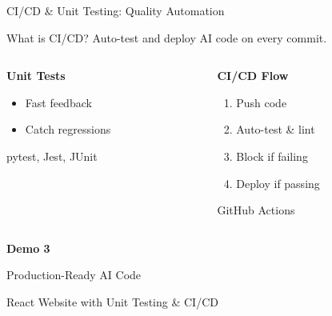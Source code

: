 \documentclass[aspectratio=169]{beamer}
\begin{document}
\begin{frame}{CI/CD \& Unit Testing: Quality Automation}
  \begin{block}{What is CI/CD?}
    Auto-test and deploy AI code on every commit.
  \end{block}

  \vspace{0.5cm}

  \begin{columns}[T]
    \begin{column}{0.48\textwidth}
      \centering
      \large\bfseries
      \textcolor{conesaTeal}{Unit Tests}

      \vspace{0.3cm}
      \normalsize

      \begin{itemize}
        \item Fast feedback
        \item Catch regressions
      \end{itemize}

      \vspace{0.2cm}
      \small
      pytest, Jest, JUnit
    \end{column}
    \begin{column}{0.48\textwidth}
      \centering
      \large\bfseries
      \textcolor{conesaOrange}{CI/CD Flow}

      \vspace{0.3cm}
      \normalsize

      \begin{enumerate}
        \item Push code
        \item Auto-test \& lint
        \item Block if failing
        \item Deploy if passing
      \end{enumerate}

      \vspace{0.2cm}
      \small
      GitHub Actions
    \end{column}
  \end{columns}
\end{frame}

\begin{frame}[plain]
  \centering
  \vspace{2cm}
  {\Huge\bfseries\textcolor{conesaTeal}{Demo 3}}
  
  \vspace{0.8cm}
  {\Large Production-Ready AI Code}
  
  \vspace{0.5cm}
  {\large React Website with Unit Testing \& CI/CD}
\end{frame}
\end{document}
